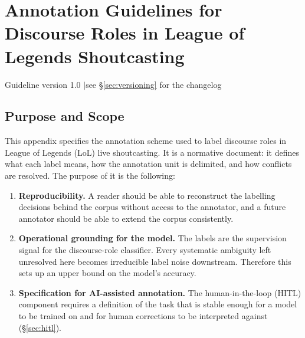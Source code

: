 %

\chapter{Annotation Guidelines for Discourse Roles in League of Legends Shoutcasting}
\label{app:guidelines}

\begin{flushright}
\footnotesize\textsf{Guideline version 1.0 \quad$\vert$\quad see \S\ref{sec:versioning} for the changelog}
\end{flushright}

\section{Purpose and Scope}
\label{sec:purpose}

This appendix specifies the annotation scheme used to label discourse roles in League of Legends (LoL) live shoutcasting. It is a normative document: it defines what each label means, how the annotation unit is delimited, and how conflicts are resolved. The purpose of it is the following:

\begin{enumerate}
  \item \textbf{Reproducibility.} A reader should be able to reconstruct the labelling decisions behind the corpus without access to the annotator, and a future annotator should be able to extend the corpus consistently.
  \item \textbf{Operational grounding for the model.} The labels are the supervision signal for the discourse-role classifier. Every systematic ambiguity left unresolved here becomes irreducible label noise downstream. Therefore this sets up an upper bound on the model's accuracy.
  \item \textbf{Specification for AI-assisted annotation.} The human-in-the-loop (HITL) component requires a definition of the task that is stable enough for a model to be trained on and for human corrections to be interpreted against (\S\ref{sec:hitl}).
\end{enumerate}

